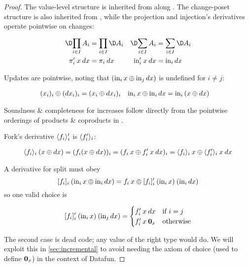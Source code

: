 \documentclass{rntz}\usepackage{fantasy}\geometry{textwidth=330pt,}
\begin{document}
\begin{proof}
  The value-level structure is inherited from \Poset{} along \valfn{}. The
  change-poset structure is also inherited from \Poset{}, while the projection
  and injection's derivatives operate pointwise on changes:

  \begin{align*}
    \chgs{\prod_{i \in I} A_i} &= \prod_{i \in I} \chgs A_i &
    \chgs{\sum_{i \in I} A_i} &= \sum_{i \in I} \chgs A_i
    \\
    \deriv\pi_i\<x\<\dx &= \pi_i\<\dx & \deriv\injc_i\<x\<\dx &= \inj i \dx
  \end{align*}

  \noindent Updates are pointwise, noting that $(\text{in}_{i}\, x \mathbin{\oplus} \text{in}_{j}\, dx)$ is
  undefined for $i \ne j$:

  \begin{align*}
    (x_i)_i \mathbin{\oplus} (dx_i)_i &= (x_i \mathbin{\oplus} dx_i)_i &
    \text{in}_{i}\, x \mathbin{\oplus} \text{in}_{i}\, dx &= \text{in}_{i}\, (x \mathbin{\oplus} dx)
  \end{align*}

  \noindent
  Soundness \& completeness for increases follow directly from the pointwise
  orderings of products \& coproducts in \Poset{}.

  Fork's derivative $\langle{f_i}\rangle_i'$ is $\langle{\ensuremath{f'}_i}\rangle_i$:

  \begin{gather*}
    \fork{f_i}_i \<(x \upd \dx)
    = (f_i(x \upd \dx))_i
    = (f_i\<x \upd \deriv f_i \<x \<\dx)_i
    = \fork{f_i}_i \<x \upd \fork{\deriv f_i}_i \<x \<\dx
  \end{gather*}

  \noindent
  A derivative for split must obey \[ \krof{f_i}_i\<(\inj i x \upd \inj i \dx)
  = f_i\<x \upd \deriv{\krof{f_i}_i} \<(\inj i x) \<(\inj i \dx) \] so one
  valid choice is

  \[\deriv{\krof{f_i}_i} \<(\inj i x) \<(\inj j \dx)
  =
  \begin{cases}
    \deriv f_i \<x \<\dx & \text{if}~i = j\\
    \deriv f_i \<x \<\zero_x & \text{otherwise}
  \end{cases}
  \]

  \noindent
  The second case is dead code; any value of the right type would do. We will
  exploit this in \cref{sec:incremental} to avoid needing the axiom of choice
  (used to define $\boldsymbol{0}_x$) in the context of Datafun.
\end{proof}
\end{document}
